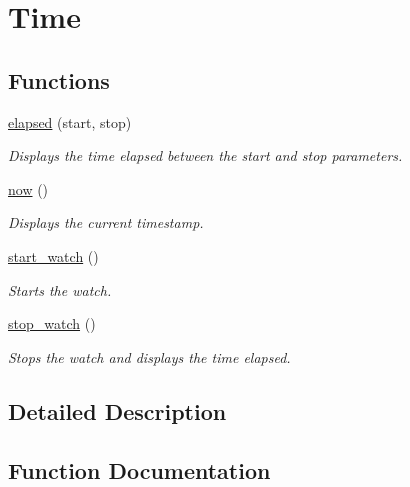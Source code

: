 \hypertarget{group__time}{}\section{Time}
\label{group__time}
\subsection*{Functions}
\begin{DoxyCompactItemize}
\item 
\hyperlink{group__time_ga680d052e47a1d2360755d65934ccdf9f}{elapsed} (start, stop)
\begin{DoxyCompactList}\small\item\em Displays the time elapsed between the \textquotesingle{}start\textquotesingle{} and \textquotesingle{}stop\textquotesingle{} parameters. \end{DoxyCompactList}\item 
\hyperlink{group__time_ga80593ccdc0339775ddd5d82c37ca4f6b}{now} ()
\begin{DoxyCompactList}\small\item\em Displays the current timestamp. \end{DoxyCompactList}\item 
\mbox{\label{group__time_ga7e2fbddbf76933cd70d29512c2f12519}} 
\hyperlink{group__time_ga7e2fbddbf76933cd70d29512c2f12519}{start\+\_\+watch} ()
\begin{DoxyCompactList}\small\item\em Starts the watch. \end{DoxyCompactList}\item 
\hyperlink{group__time_gabdbb7601d766420b7be1703457c91aa7}{stop\+\_\+watch} ()
\begin{DoxyCompactList}\small\item\em Stops the watch and displays the time elapsed. \end{DoxyCompactList}\end{DoxyCompactItemize}


\subsection{Detailed Description}


\subsection{Function Documentation}
\mbox{\label{group__time_ga680d052e47a1d2360755d65934ccdf9f}} 
